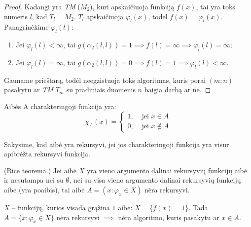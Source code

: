 \begin{prop}
\begin{proof}
    Kadangi yra \emph{TM} ($M_{2}$), kuri apskaičiuoja funkciją $f(x)$,
    tai yra toks numeris $l$, kad $T_{l} = M_{2}$. $T_{l}$ apskaičiuoja
    $\varphi_{l}(x)$, todėl $f(x) = \varphi_{l}(x)$. Panagrinėkime 
    $\varphi_{l}(l)$:
    \begin{enumerate}
      \item Jei $\varphi_{l}(l) < \infty$, tai 
        $g(\alpha_{2}(l,l)) = 1 \implies f(l) = \infty \implies%
        \varphi_{l}(l) = \infty$;
      \item Jei $\varphi_{l}(l) = \infty$, tai 
        $g(\alpha_{2}(l,l)) = 0 \implies f(l) = 1 \implies%
        \varphi_{l}(l) < \infty$.
    \end{enumerate}
    Gauname prieštarą, todėl neegzistuoja toks algoritmas, kuris 
    porai $(m;n)$ pasakytu ar \emph{TM} $T_{m}$ su pradiniais duomenis
    $n$ baigia darbą ar ne.
  \end{proof}
\end{prop}

\begin{defn}
  Aibės A charakteringoji funkcija yra:
  \[
  \chi _{A}(x) =%
  \begin{cases}
    1, & \text{ jei } x \in A \\
    0, & \text{ jei } x \not \in A
  \end{cases}
  \]
\end{defn}

\begin{defn}
  Sakysime, kad aibė yra rekursyvi, jei jos charakteringoji funkcija yra
  visur apibrėžta rekursyvi funkcija.
\end{defn}

\begin{note}
  (Rice teorema.) Jei aibė $X$ yra vieno argumento dalinai rekursyvių
  funkcijų aibė ir nesutampa nei su $\emptyset$, nei su visa vieno
  argumento dalinai rekursyvių funkcijų aibe (yra poaibis), tai 
  aibė $A = (x : \varphi_{x} \in X)$ nėra rekursyvi.
  \begin{exmp}
    $X$ – funkcijų, kurios visada grąžina $1$ aibė: $X = \{ f(x) = 1 \}$.
    Tada $A = \{ x : \varphi_{x} \in X \}$ nėra rekursyvi $\implies$
    nėra algoritmo, kuris pasakytu ar $x \in A$.
  \end{exmp}
\end{note}

